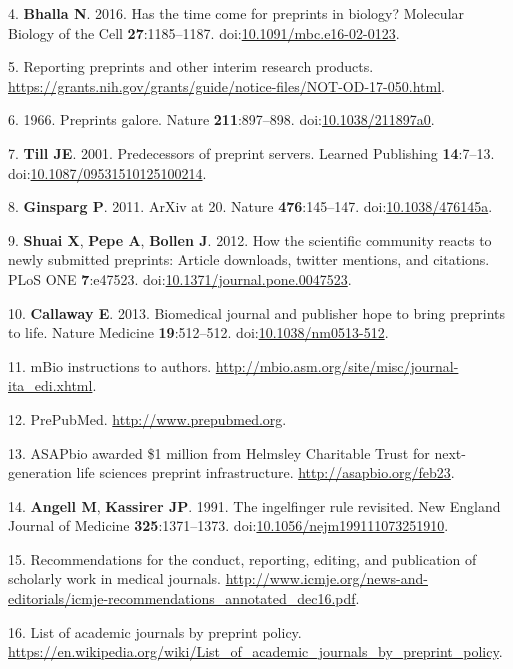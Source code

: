 \documentclass[11,]{article}
\begin{document}
4. \textbf{Bhalla N}. 2016. Has the time come for preprints in biology?
Molecular Biology of the Cell \textbf{27}:1185--1187.
doi:\href{http://dx.doi.org/10.1091/mbc.e16-02-0123}{10.1091/mbc.e16-02-0123}.

5. Reporting preprints and other interim research products.
\url{https://grants.nih.gov/grants/guide/notice-files/NOT-OD-17-050.html}.

6. 1966. Preprints galore. Nature \textbf{211}:897--898.
doi:\href{http://dx.doi.org/10.1038/211897a0}{10.1038/211897a0}.

7. \textbf{Till JE}. 2001. Predecessors of preprint servers. Learned
Publishing \textbf{14}:7--13.
doi:\href{http://dx.doi.org/10.1087/09531510125100214}{10.1087/09531510125100214}.

8. \textbf{Ginsparg P}. 2011. ArXiv at 20. Nature \textbf{476}:145--147.
doi:\href{http://dx.doi.org/10.1038/476145a}{10.1038/476145a}.

9. \textbf{Shuai X}, \textbf{Pepe A}, \textbf{Bollen J}. 2012. How the
scientific community reacts to newly submitted preprints: Article
downloads, twitter mentions, and citations. PLoS ONE \textbf{7}:e47523.
doi:\href{http://dx.doi.org/10.1371/journal.pone.0047523}{10.1371/journal.pone.0047523}.

10. \textbf{Callaway E}. 2013. Biomedical journal and publisher hope to
bring preprints to life. Nature Medicine \textbf{19}:512--512.
doi:\href{http://dx.doi.org/10.1038/nm0513-512}{10.1038/nm0513-512}.

11. mBio instructions to authors.
\url{http://mbio.asm.org/site/misc/journal-ita_edi.xhtml}.

12. PrePubMed. \url{http://www.prepubmed.org}.

13. ASAPbio awarded \$1 million from Helmsley Charitable Trust for
next-generation life sciences preprint infrastructure.
\url{http://asapbio.org/feb23}.

14. \textbf{Angell M}, \textbf{Kassirer JP}. 1991. The ingelfinger rule
revisited. New England Journal of Medicine \textbf{325}:1371--1373.
doi:\href{http://dx.doi.org/10.1056/nejm199111073251910}{10.1056/nejm199111073251910}.

15. Recommendations for the conduct, reporting, editing, and publication
of scholarly work in medical journals.
\url{http://www.icmje.org/news-and-editorials/icmje-recommendations_annotated_dec16.pdf}.

16. List of academic journals by preprint policy.
\url{https://en.wikipedia.org/wiki/List_of_academic_journals_by_preprint_policy}.
\end{document}

